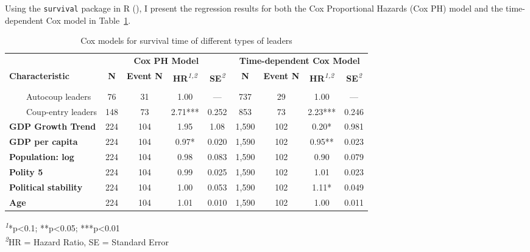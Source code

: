 \documentclass[
  12pt,
]{report}
\begin{document}
Using the \texttt{survival} package in R
(), I present the regression
results for both the Cox Proportional Hazards (Cox PH) model and the
time-dependent Cox model in Table~\ref{tbl-cox}.

\begingroup
\fontsize{12.0pt}{14.4pt}\selectfont
\setlength{\LTpost}{0mm}

\begin{longtable}{lcccccccc}

\caption{\label{tbl-cox}Cox models for survival time of different types
of leaders}

\tabularnewline

\toprule
 & \multicolumn{4}{c}{\textbf{Cox PH Model}} & \multicolumn{4}{c}{\textbf{Time-dependent Cox Model}} \\ 
\cmidrule(lr){2-5} \cmidrule(lr){6-9}
\textbf{Characteristic} & \textbf{N} & \textbf{Event N} & \textbf{HR}\textsuperscript{\textit{1,2}} & \textbf{SE}\textsuperscript{\textit{2}} & \textbf{N} & \textbf{Event N} & \textbf{HR}\textsuperscript{\textit{1,2}} & \textbf{SE}\textsuperscript{\textit{2}} \\ 
\midrule\addlinespace[2.5pt]
{\bfseries Leader Type} &  &  &  &  &  &  &  &  \\ 
    Autocoup leaders & 76 & 31 & 1.00 & — & 737 & 29 & 1.00 & — \\ 
    Coup-entry leaders & 148 & 73 & 2.71*** & 0.252 & 853 & 73 & 2.23*** & 0.246 \\ 
{\bfseries GDP Growth Trend} & 224 & 104 & 1.95 & 1.08 & 1,590 & 102 & 0.20* & 0.981 \\ 
{\bfseries GDP per capita} & 224 & 104 & 0.97* & 0.020 & 1,590 & 102 & 0.95** & 0.023 \\ 
{\bfseries Population: log} & 224 & 104 & 0.98 & 0.083 & 1,590 & 102 & 0.90 & 0.079 \\ 
{\bfseries Polity 5} & 224 & 104 & 0.99 & 0.025 & 1,590 & 102 & 1.01 & 0.023 \\ 
{\bfseries Political stability} & 224 & 104 & 1.00 & 0.053 & 1,590 & 102 & 1.11* & 0.049 \\ 
{\bfseries Age} & 224 & 104 & 1.01 & 0.010 & 1,590 & 102 & 1.00 & 0.011 \\ 
\bottomrule

\end{longtable}

\begin{minipage}{\linewidth}
\textsuperscript{\textit{1}}*p\textless{}0.1; **p\textless{}0.05; ***p\textless{}0.01\\
\textsuperscript{\textit{2}}HR = Hazard Ratio, SE = Standard Error\\
\end{minipage}
\endgroup
\end{document}
